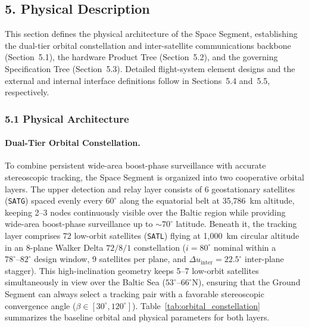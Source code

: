 \subsection{5. Physical Description}

This section defines the physical architecture of the  Space Segment, establishing the dual-tier orbital constellation and inter-satellite communications backbone (Section~5.1), the hardware Product Tree (Section~5.2), and the governing Specification Tree (Section~5.3). Detailed flight-system element designs and the external and internal interface definitions follow in Sections~5.4 and~5.5, respectively.

\subsubsection{5.1 Physical Architecture}

\paragraph{Dual-Tier Orbital Constellation.}
To combine persistent wide-area boost-phase surveillance with accurate stereoscopic tracking, the Space Segment is organized into two cooperative orbital layers. The upper detection and relay layer consists of 6 geostationary satellites (\texttt{SATG}) spaced evenly every $60^\circ$ along the equatorial belt at 35,786~km altitude, keeping 2--3 nodes continuously visible over the Baltic region while providing wide-area boost-phase surveillance up to $\sim 70^\circ$ latitude. Beneath it, the tracking layer comprises 72 low-orbit satellites (\texttt{SATL}) flying at 1,000~km circular altitude in an 8-plane Walker Delta $72/8/1$ constellation ($i = 80^\circ$ nominal within a $78^\circ\text{--}82^\circ$ design window, 9 satellites per plane, and $\Delta u_{\text{inter}} = 22.5^\circ$ inter-plane stagger). This high-inclination geometry keeps 5--7 low-orbit satellites simultaneously in view over the Baltic Sea ($53^\circ\text{--}66^\circ\text{N}$), ensuring that the Ground Segment can always select a tracking pair with a favorable stereoscopic convergence angle ($\beta \in [30^\circ, 120^\circ]$). Table~\ref{tab:orbital_constellation} summarizes the baseline orbital and physical parameters for both layers.

